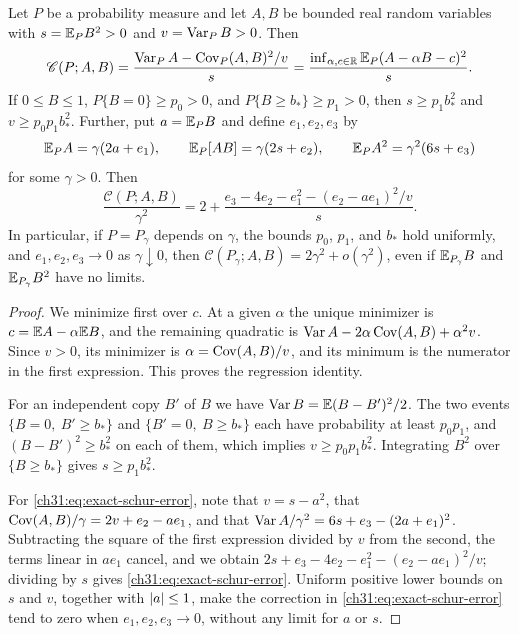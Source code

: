 \begin{lemma}\label{ch31:lem:regression}
Let $P$ be a probability measure and let $A,B$ be bounded real random variables with $s=\mathbb E_PB^2>0$ and $v=\operatorname{Var}_PB>0$. Then
\[
 \mathscr C(P;A,B)=\frac{\operatorname{Var}_PA-\operatorname{Cov}_P(A,B)^2/v}{s}=\frac{\inf_{\alpha,c\in\mathbb R}\mathbb E_P(A-\alpha B-c)^2}{s}.
\]
If $0\le B\le1$, $P\{B=0\}\ge p_0>0$, and $P\{B\ge b_*\}\ge p_1>0$, then $s\ge p_1b_*^2$ and $v\ge p_0p_1b_*^2$. Further, put $a=\mathbb E_PB$ and define $e_1,e_2,e_3$ by
\[
 \mathbb E_PA=\gamma(2a+e_1),\qquad\mathbb E_P[AB]=\gamma(2s+e_2),\qquad\mathbb E_PA^2=\gamma^2(6s+e_3)
\]
for some $\gamma>0$. Then
\begin{equation}\label{ch31:eq:exact-schur-error}
 \frac{\mathscr C(P;A,B)}{\gamma^2}=2+\frac{e_3-4e_2-e_1^2-(e_2-ae_1)^2/v}{s}.
\end{equation}
In particular, if $P=P_\gamma$ depends on $\gamma$, the bounds $p_0$, $p_1$, and $b_*$ hold uniformly, and $e_1,e_2,e_3\to0$ as $\gamma\downarrow0$, then $\mathscr C(P_\gamma;A,B)=2\gamma^2+o(\gamma^2)$, even if $\mathbb E_{P_\gamma}B$ and $\mathbb E_{P_\gamma}B^2$ have no limits.
\end{lemma}

\begin{proof}
We minimize first over $c$. At a given $\alpha$ the unique minimizer is $c=\mathbb E A-\alpha\mathbb E B$, and the remaining quadratic is $\operatorname{Var} A-2\alpha\operatorname{Cov}(A,B)+\alpha^2v$. Since $v>0$, its minimizer is $\alpha=\operatorname{Cov}(A,B)/v$, and its minimum is the numerator in the first expression. This proves the regression identity.

For an independent copy $B'$ of $B$ we have $\operatorname{Var} B=\mathbb E(B-B')^2/2$. The two events $\{B=0,\ B'\ge b_*\}$ and $\{B'=0,\ B\ge b_*\}$ each have probability at least $p_0p_1$, and $(B-B')^2\ge b_*^2$ on each of them, which implies $v\ge p_0p_1b_*^2$. Integrating $B^2$ over $\{B\ge b_*\}$ gives $s\ge p_1b_*^2$.

For \eqref{ch31:eq:exact-schur-error}, note that $v=s-a^2$, that $\operatorname{Cov}(A,B)/\gamma=2v+e_2-ae_1$, and that $\operatorname{Var} A/\gamma^2=6s+e_3-(2a+e_1)^2$. Subtracting the square of the first expression divided by $v$ from the second, the terms linear in $ae_1$ cancel, and we obtain $2s+e_3-4e_2-e_1^2-(e_2-ae_1)^2/v$; dividing by $s$ gives \eqref{ch31:eq:exact-schur-error}. Uniform positive lower bounds on $s$ and $v$, together with $\lvert a\rvert\le1$, make the correction in \eqref{ch31:eq:exact-schur-error} tend to zero when $e_1,e_2,e_3\to0$, without any limit for $a$ or $s$.
\end{proof}


